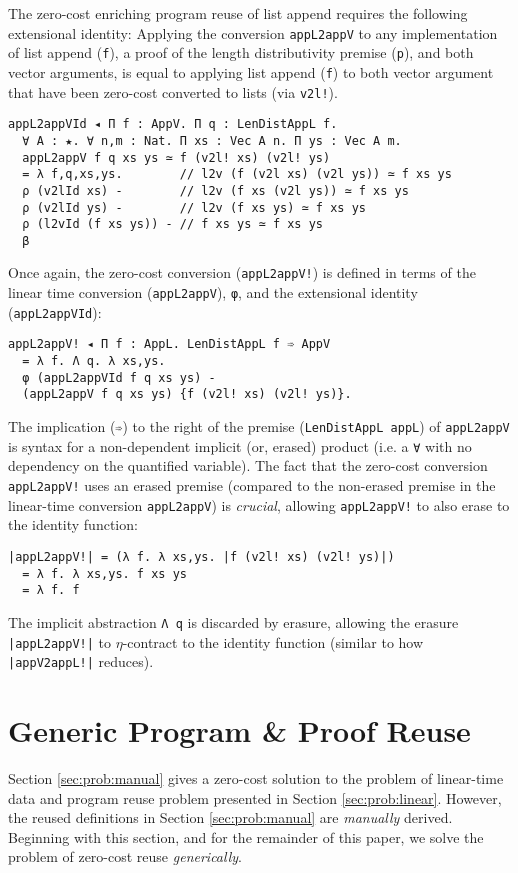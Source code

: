 \documentclass[acmsmall,screen]{acmart}
\newcommand{\refsec}[1]{Section \ref{sec:#1}}
\newcommand{\labsec}[1]{\label{sec:#1}}
\begin{document}
The zero-cost enriching program reuse of list append requires
the following extensional identity:
Applying the conversion \verb;appL2appV; to any implementation of
list append (\verb;f;), a proof of the length distributivity premise (\verb;p;),
and both vector arguments, is equal
to applying list append (\verb;f;) to both vector argument that have been
zero-cost converted to lists (via \verb;v2l!;).
\begin{verbatim}
appL2appVId ◂ Π f : AppV. Π q : LenDistAppL f.
  ∀ A : ★. ∀ n,m : Nat. Π xs : Vec A n. Π ys : Vec A m.
  appL2appV f q xs ys ≃ f (v2l! xs) (v2l! ys)
  = λ f,q,xs,ys.        // l2v (f (v2l xs) (v2l ys)) ≃ f xs ys
  ρ (v2lId xs) -        // l2v (f xs (v2l ys)) ≃ f xs ys
  ρ (v2lId ys) -        // l2v (f xs ys) ≃ f xs ys
  ρ (l2vId (f xs ys)) - // f xs ys ≃ f xs ys
  β
\end{verbatim}
Once again, the zero-cost conversion (\verb;appL2appV!;) is defined in
terms of the linear time conversion (\verb;appL2appV;),
\verb;φ;, and the extensional identity (\verb;appL2appVId;):
\begin{verbatim}
appL2appV! ◂ Π f : AppL. LenDistAppL f ➾ AppV
  = λ f. Λ q. λ xs,ys. 
  φ (appL2appVId f q xs ys) - 
  (appL2appV f q xs ys) {f (v2l! xs) (v2l! ys)}.
\end{verbatim}
The implication (\verb;➾;) to the right of the
premise (\verb;LenDistAppL appL;) of \verb;appL2appV; is syntax for a
non-dependent implicit (or, erased) product (i.e. a \verb;∀; with no
dependency on the quantified variable).
The fact that the zero-cost conversion \verb;appL2appV!; uses an
erased premise (compared to the non-erased premise in the linear-time
conversion \verb;appL2appV;) is \textit{crucial},
allowing \verb;appL2appV!; to also erase to the identity function:
\begin{verbatim}
|appL2appV!| = (λ f. λ xs,ys. |f (v2l! xs) (v2l! ys)|) 
  = λ f. λ xs,ys. f xs ys 
  = λ f. f
\end{verbatim}
The implicit abstraction \verb;Λ q; is discarded by erasure,
allowing the erasure \verb;|appL2appV!|; to $\eta$-contract to the
identity function (similar to how \verb;|appV2appL!|; reduces).

\section{Generic Program \& Proof Reuse}
\labsec{prog}

\refsec{prob:manual} gives a zero-cost solution to the problem of
linear-time data and program reuse problem presented in
\refsec{prob:linear}. However, the reused definitions in
\refsec{prob:manual} are \textit{manually} derived. Beginning with
this section, and for the remainder of this paper, we solve the
problem of zero-cost reuse \textit{generically}.
\end{document}
